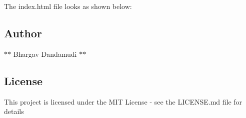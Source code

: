 The index.\+html file looks as shown below\+:  \subsection*{Author}


\begin{DoxyItemize}
\item $\ast$$\ast$ Bhargav Dandamudi $\ast$$\ast$
\end{DoxyItemize}

\subsection*{License}

This project is licensed under the M\+IT License -\/ see the L\+I\+C\+E\+N\+SE.md file for details 
